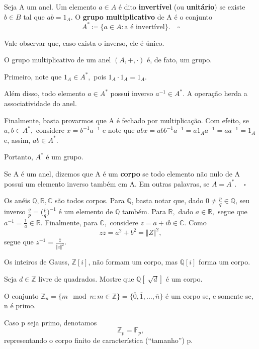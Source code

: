 \documentclass[AlgebraII/algebraII_notes.tex]{subfiles}
\begin{document}
\begin{def*}
	Seja A um anel. Um elemento \(a\in A\) é dito \textbf{invertível} (ou \textbf{unitário}) se existe \(b\in B\) tal que \(ab = 1_{A}.\) O \textbf{grupo multiplicativo} de A
	é o conjunto
	\[
		A^{*}\coloneqq \{a\in A: \text{a é invertível}\}.\quad\square
	\]
\end{def*}
Vale observar que, caso exista o inverso, ele é único.
\begin{prop*}
	O grupo multiplicativo de um anel \((A, +, \cdot )\) é, de fato, um grupo.
\end{prop*}
\begin{proof*}
	Primeiro, note que \(1_{A}\in A^{*},\) pois \(1_{A} \cdot 1_{A} = 1_{A}.\)

	Além disso, todo elemento \(a\in A^{*}\) possui inverso \(a^{-1}\in A^{*}.\) A operação herda a associatividade do anel.

	Finalmente, basta provarmos que A é fechado por multiplicação. Com efeito, se \(a, b\in A^{*},\) considere \(x = b^{-1}a^{-1}\) e note que \(abx = abb^{-1}a^{-1} =
	a 1_{A} a^{-1} = aa^{-1} = 1_{A}\) e, assim, \(ab\in A^{*}.\)

	Portanto, \(A^{*}\) é um grupo. \qedsymbol
\end{proof*}
\begin{def*}
	Se A é um anel, dizemos que A é um \textbf{corpo} se todo elemento não nulo de A possui um elemento inverso também em A. Em outras palavras, se \(A = A^{*}.\quad\square\)
\end{def*}
\begin{example}
	Os anéis \(\mathbb{Q}, \mathbb{R}, \mathbb{C}\) são todos corpos. Para \(\mathbb{Q}\), basta notar que, dado \(0\neq \frac{p}{q}\in \mathbb{Q}\), seu inverso
	\(\frac{q}{p} = \biggl(\frac{p}{q}\biggr)^{-1}\) é um elemento de \(\mathbb{Q}\) também. Para \(\mathbb{R},\) dado \(a\in \mathbb{R},\) segue que \(a^{-1} = \frac{1}{a}\in \mathbb{R}\).
	Finalmente, para \(\mathbb{C},\) considere \(z = a + ib\in \mathbb{C}.\) Como
	\[
		z\overline{z} = a^{2} + b^{2} = \Vert Z \Vert^{2},
	\]
	segue que \(z^{-1}=\frac{\overline{z}}{\Vert z \Vert^{2}}.\)

	Os inteiros de Gauss, \(\mathbb{Z}[i]\), não formam um corpo, mas \(\mathbb{Q}[i]\) forma um corpo.
\end{example}
\begin{example}[Exercício]
	Seja \(d\in \mathbb{Z}\) livre de quadrados. Mostre que \(\mathbb{Q}[\sqrt[]{d}]\) é um corpo.
\end{example}
\begin{theorem*}
	O conjunto \(\mathbb{Z}_{n} = \{m\mod n: m\in \mathbb{Z}\} = \{\overline{0}, \overline{1}, \dotsc , \overline{n}\}\) é um corpo se, e somente se, n é primo.
\end{theorem*}
Caso p seja primo, denotamos
\[
	\mathbb{Z}_{p} = \mathbb{F}_{p},
\]
representando o corpo finito de característica (``tamanho'') p.
\end{document}
